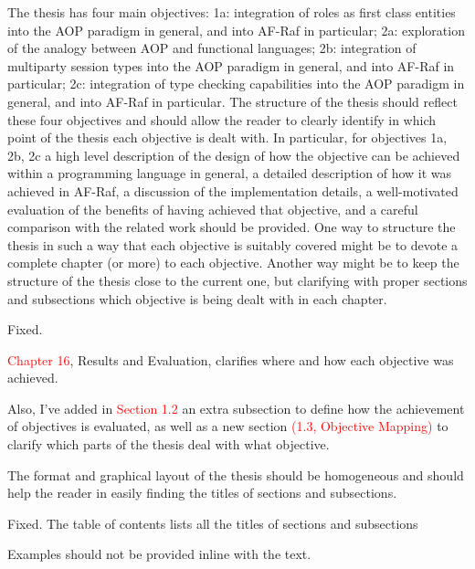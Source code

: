 \documentclass{article}
\newcommand*\R[1]{\textcolor{red}{#1}} %
\newenvironment{them}{\noindent\begingroup\color{blue}}{\endgroup\par}
\begin{document}
\begin{them}

The thesis has four main objectives: 1a: integration of roles as first class
entities into the AOP paradigm in general, and into AF-Raf in particular; 2a:
exploration of the analogy between AOP and functional languages; 2b:
integration of multiparty session types into the AOP paradigm in general, and
into AF-Raf in particular; 2c: integration of type checking capabilities into
the AOP paradigm in general, and into AF-Raf in particular.  The structure of
the thesis should reflect these four objectives and should allow the reader to
clearly identify in which point of the thesis each objective is dealt with. In
particular, for objectives 1a, 2b, 2c a high level description of the design of
how the objective can be achieved within a programming language in general, a
detailed description of how it was achieved in AF-Raf, a discussion of the
implementation details, a well-motivated evaluation of the benefits of having
achieved that objective, and a careful comparison with the related work should
be provided.  One way to structure the thesis in such a way that each objective
is suitably covered might be to devote a complete chapter (or more) to each
objective. Another way might be to keep the structure of the thesis close to
the current one, but clarifying with proper sections and subsections which
objective is being dealt with in each chapter.

\end{them}
Fixed. 

\R{Chapter 16}, Results and Evaluation, clarifies where and how each objective
was achieved.

Also, I've added in \R{Section 1.2} an extra subsection to define how the
achievement of objectives is evaluated, as well as a new  section \R{(1.3,
Objective Mapping)} to clarify which parts of the thesis deal with what
objective.

\begin{them}

The format and graphical layout of the thesis should be homogeneous and should
help the reader in easily finding the titles of sections and subsections.

\end{them}
Fixed. The table of contents lists all the titles of sections and subsections

\begin{them}

Examples should not be provided inline with the text.
\end{them}
\end{document}
